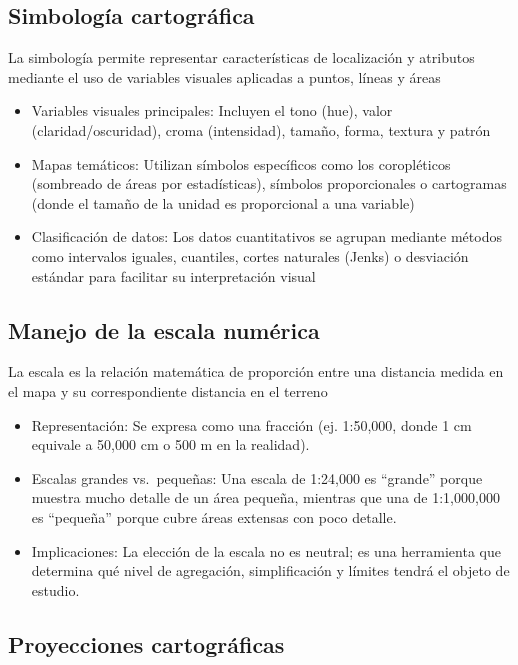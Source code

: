 \documentclass[
  letterpaper,
  DIV=11,
  numbers=noendperiod]{scrreprt}
\providecommand{\tightlist}{%
  \setlength{\itemsep}{0pt}\setlength{\parskip}{0pt}}\usepackage{longtable,booktabs,array}
\begin{document}
\subsection{Simbología
cartográfica}\label{simbologuxeda-cartogruxe1fica}

La simbología permite representar características de localización y
atributos mediante el uso de variables visuales aplicadas a puntos,
líneas y áreas

\begin{itemize}
\tightlist
\item
  Variables visuales principales: Incluyen el tono (hue), valor
  (claridad/oscuridad), croma (intensidad), tamaño, forma, textura y
  patrón
\item
  Mapas temáticos: Utilizan símbolos específicos como los coropléticos
  (sombreado de áreas por estadísticas), símbolos proporcionales o
  cartogramas (donde el tamaño de la unidad es proporcional a una
  variable)
\item
  Clasificación de datos: Los datos cuantitativos se agrupan mediante
  métodos como intervalos iguales, cuantiles, cortes naturales (Jenks) o
  desviación estándar para facilitar su interpretación visual
\end{itemize}

\subsection{Manejo de la escala
numérica}\label{manejo-de-la-escala-numuxe9rica}

La escala es la relación matemática de proporción entre una distancia
medida en el mapa y su correspondiente distancia en el terreno

\begin{itemize}
\tightlist
\item
  Representación: Se expresa como una fracción (ej. 1:50,000, donde 1 cm
  equivale a 50,000 cm o 500 m en la realidad).
\item
  Escalas grandes vs.~pequeñas: Una escala de 1:24,000 es ``grande''
  porque muestra mucho detalle de un área pequeña, mientras que una de
  1:1,000,000 es ``pequeña'' porque cubre áreas extensas con poco
  detalle.
\item
  Implicaciones: La elección de la escala no es neutral; es una
  herramienta que determina qué nivel de agregación, simplificación y
  límites tendrá el objeto de estudio.
\end{itemize}

\subsection{Proyecciones
cartográficas}\label{proyecciones-cartogruxe1ficas}
\end{document}
